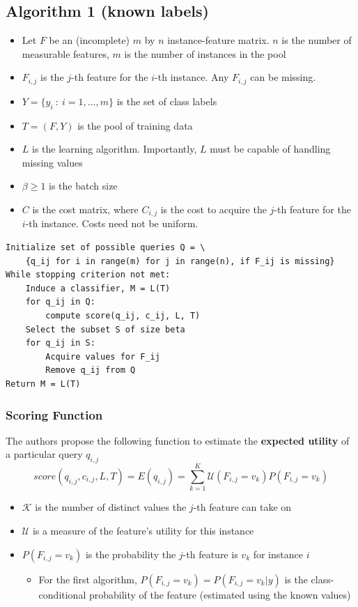 \documentclass[10pt]{article}
\begin{document}
\subsection*{Algorithm 1 (known labels)}
\begin{itemize}
	\item Let $F$ be an (incomplete) $m$ by $n$ instance-feature matrix.  $n$ is the number of measurable features, $m$ is the number of instances in the pool
	\item $F_{i, j}$ is the $j$-th feature for the $i$-th instance.  Any $F_{i, j}$ can be missing.
	\item $Y = \{y_i \::\: i = 1, \dots, m\}$ is the set of class labels
	\item $T = (F, Y)$ is the pool of training data
	\item $L$ is the learning algorithm.  Importantly, $L$ must be capable of handling missing values
	\item $\beta \geq 1$ is the batch size
	\item $C$ is the cost matrix, where $C_{i, j}$ is the cost to acquire the $j$-th feature for the $i$-th instance.  Costs need not be uniform.
\end{itemize}
\begin{verbatim}
Initialize set of possible queries Q = \
    {q_ij for i in range(m) for j in range(n), if F_ij is missing}
While stopping criterion not met:
    Induce a classifier, M = L(T)
    for q_ij in Q:
        compute score(q_ij, c_ij, L, T)
    Select the subset S of size beta
    for q_ij in S:
        Acquire values for F_ij
        Remove q_ij from Q
Return M = L(T)
\end{verbatim}

\subsubsection*{Scoring Function}
The authors propose the following function to estimate the \textbf{expected utility} of a particular query $q_{i, j}$
\[score(q_{i, j}, c_{i, j}, L, T) = E(q_{i, j}) = \sum_{k = 1}^K \mathcal{U} (F_{i, j} = v_k) P(F_{i, j} = v_k)\]
\begin{itemize}
	\item $\mathcal{K}$ is the number of distinct values the $j$-th feature can take on
	\item $\mathcal{U}$ is a measure of the feature's utility for this instance
	\item $P(F_{i, j} = v_k)$ is the probability the $j$-th feature is $v_k$ for instance $i$
	\begin{itemize}
	    \item For the first algorithm, $P(F_{i, j} = v_k) = P(F_{i, j} = v_k | y)$ is the class-conditional probability of the feature (estimated using the known values)
    \end{itemize}
\end{itemize}
\end{document}
